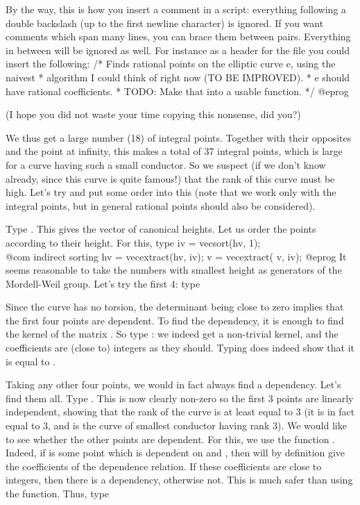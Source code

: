 \noindent By the way, this is how you insert a comment in a script:
everything following a double backslash (up to the first newline character)
is ignored. If you want comments which span many lines, you can brace them
between  pairs. Everything in between will be ignored as well.
For instance as a header for the file  you could insert the
following:
\bprog
/* Finds rational points on the elliptic curve e, using the naivest
 * algorithm I could think of right now (TO BE IMPROVED).
 * e should have rational coefficients.
 * TODO: Make that into a usable function.
 */
@eprog

(I hope you did not waste your time copying this nonsense, did you?)

We thus get a large number (18) of integral points. Together with their
opposites and the point at infinity, this makes a total of 37 integral
points, which is large for a curve having such a small conductor. So we
suspect (if we don't know already, since this curve is quite famous!) that
the rank of this curve must be high. Let's try and put some order into this
(note that we work only with the integral points, but in general rational
points should also be considered).

Type . This gives the vector of canonical heights.
Let us order the points according to their height. For this, type
\bprog
  iv = vecsort(hv, 1);    \\@com indirect sorting
  hv = vecextract(hv, iv);
  v  = vecextract( v, iv);
@eprog
\noindent
It seems reasonable to take the numbers with smallest height as generators of
the Mordell-Weil group. Let's try the first 4: type


Since the curve has no torsion, the determinant being close to zero implies
that the first four points are dependent. To find the dependency, it is
enough to find the kernel of the matrix . So type :
we indeed get a non-trivial kernel, and the coefficients are (close to)
integers as they should. Typing  does indeed show
that it is equal to .

Taking any other four points, we would in fact always find a dependency.
Let's find them all. Type . This is now clearly non-zero so the first 3 points
are linearly independent, showing that the rank of the curve is at least
equal to 3 (it is in fact equal to 3, and  is the curve of smallest
conductor having rank 3). We would like to see whether the other points are
dependent. For this, we use the function . Indeed, if  is
some point which is dependent on  and , then
 will by definition give the coefficients
of the dependence relation. If these coefficients are close to integers, then
there is a dependency, otherwise not.  This is much safer than using the
 function. Thus, type

